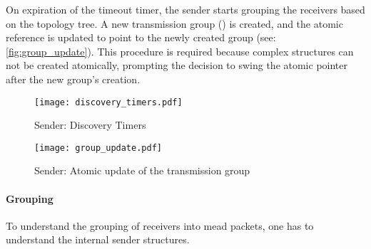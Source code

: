 On expiration of the timeout timer, the sender starts grouping the receivers
    based on the topology tree.
A new transmission group () is created, and the atomic
    reference is updated to point to the newly created group (see:
    \autoref{fig:group_update}).
This procedure is required because complex structures can not be created
    atomically, prompting the decision to swing the atomic pointer after the
    new group's creation.


\begin{figure}
    \begin{center}
        \texttt{[image: discovery\_timers.pdf]}
    \end{center}
    \caption{Sender: Discovery Timers}
    \label{fig:discovery_timers}
\end{figure}

\begin{figure}
    \begin{center}
        \texttt{[image: group\_update.pdf]}
    \end{center}
    \caption{Sender: Atomic update of the transmission group}
    \label{fig:group_update}
\end{figure}

\paragraph{Grouping} %
\label{par:Grouping}
To understand the grouping of receivers into \gls{mead} packets, one has to
    understand the internal sender structures.



